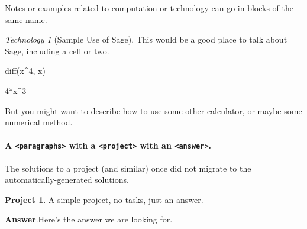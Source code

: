 \documentclass{amsart}
\theoremstyle{plain}%
\theoremstyle{definition}%
\newtheorem{project}[theorem]{Project}
\theoremstyle{remark}%
\newtheorem{technology}[theorem]{Technology}
\newcommand{\blocktitlefont}{\relax}
\newcommand{\xreffont}{\relax}
\newcommand{\mono}[1]{\texttt{#1}}
\numberwithin{equation}{section}
\begin{document}
Notes or examples related to computation or technology can go in blocks of the same name.%
\begin{technology}[Sample Use of Sage]\label{section-interesting-corollary-5-3-19}%
%
This would be a good place to talk about Sage, including a cell or two.%
\begin{sageinput}
diff(x^4, x)
\end{sageinput}
\begin{sageoutput}
4*x^3
\end{sageoutput}
But you might want to describe how to use some other calculator, or maybe some numerical method.%
\end{technology}
\paragraph*{A \mono{<paragraphs>} with a \mono{<project>} with an \mono{<answer>}.}\label{section-interesting-corollary-5-3-20}%
The solutions to a project (and similar) once did not migrate to the automatically-generated solutions.%
\begin{project}\label{section-interesting-corollary-5-3-20-3}%
%
A simple project, no tasks, just an answer.%
\par\smallskip%
\noindent\textbf{\blocktitlefont Answer}.\hypertarget{section-interesting-corollary-5-3-20-3-2}{}\quad{}Here's the answer we are looking for.%
\end{project}%
%
%
\typeout{************************************************}
\typeout{************************************************}
%
\end{document}
